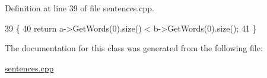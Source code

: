 Definition at line 39 of file sentences.\+cpp.


\begin{DoxyCode}
39                                                                     \{
40     \textcolor{keywordflow}{return} a->GetWords(0).size() < b->GetWords(0).size();
41   \}
\end{DoxyCode}


The documentation for this class was generated from the following file\+:\begin{DoxyCompactItemize}
\item 
\hyperlink{sentences_8cpp}{sentences.\+cpp}\end{DoxyCompactItemize}
